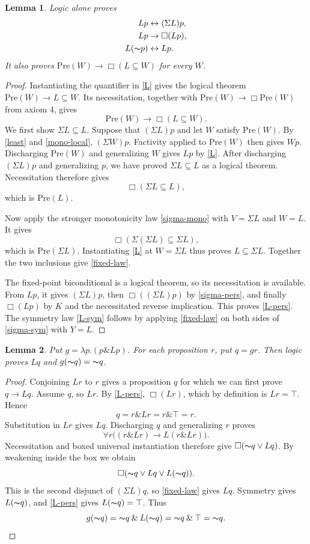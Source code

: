 \documentclass[12pt,leqno]{article}
\newcommand{\AND}{\ensuremath{\mathbin{\&}}}
\newcommand{\OR}{\ensuremath{\vee}}
\newcommand{\IFF}{\ensuremath{\leftrightarrow}}
\newcommand{\IC}{\ensuremath{\rightarrow}}
\newcommand{\NOT}{\ensuremath{\text{$\thicksim$}}}
\newcommand{\Pre}{\mathrm{Pre}}
\newtheorem{lemma}{Lemma}
\begin{document}
\begin{lemma}\label{fixed}
Logic alone proves
\begin{align}
 Lp&\IFF(\Sigma L)p,\label{fixed-law}\\
 Lp&\IC\Box(Lp),\label{L-pers}\\
 L(\NOT p)&\IFF Lp.\label{L-sym}
\end{align}
It also proves $\Pre(W)\IC\Box(L\subseteq W)$ for every $W$.
\end{lemma}
\begin{proof}
Instantiating the quantifier in \eqref{L} gives the logical theorem
$\Pre(W)\IC L\subseteq W$. Its necessitation, together with
$\Pre(W)\IC\Box\Pre(W)$ from axiom $4$, gives
\begin{equation}
 \Pre(W)\IC\Box(L\subseteq W).
 \label{least}
\end{equation}
We first show $\Sigma L\subseteq L$. Suppose that $(\Sigma L)p$ and
let $W$ satisfy $\Pre(W)$. By \eqref{least} and
\eqref{mono-local}, $(\Sigma W)p$. Factivity applied to
$\Pre(W)$ then gives $Wp$. Discharging $\Pre(W)$ and generalizing
$W$ gives $Lp$ by \eqref{L}. After discharging $(\Sigma L)p$ and generalizing $p$,
we have proved $\Sigma L\subseteq L$ as a logical theorem.
Necessitation therefore gives
\[
 \Box(\Sigma L\subseteq L),
\]
which is $\Pre(L)$.

Now apply the stronger monotonicity law \eqref{sigma-mono} with
$V=\Sigma L$ and $W=L$. It gives
\[
 \Box(\Sigma(\Sigma L)\subseteq\Sigma L),
\]
which is $\Pre(\Sigma L)$. Instantiating \eqref{L} at
$W=\Sigma L$ thus proves $L\subseteq\Sigma L$.
Together the two inclusions give \eqref{fixed-law}.

The fixed-point biconditional is a logical theorem, so its necessitation
is available. From $Lp$, it gives $(\Sigma L)p$, then
$\Box((\Sigma L)p)$ by \eqref{sigma-pers}, and finally $\Box(Lp)$
by $K$ and the necessitated reverse implication. This proves
\eqref{L-pers}. The symmetry law \eqref{L-sym} follows by applying
\eqref{fixed-law} on both sides of \eqref{sigma-sym} with $Y=L$.
\end{proof}

\begin{lemma}\label{diagonal}
Put $g=\lambda p.(p\AND Lp)$. For each proposition $r$, put $q=gr$.
Then logic proves $Lq$ and $g(\NOT q)=\NOT q$.
\end{lemma}
\begin{proof}
Conjoining $Lr$ to $r$ gives a proposition $q$ for which we can first
prove $q\IC Lq$. Assume $q$, so $Lr$. By \eqref{L-pers},
$\Box(Lr)$, which by definition is $Lr=\top$. Hence
\[
 q=r\AND Lr=r\AND\top=r.
\]
Substitution in $Lr$ gives $Lq$.
Discharging $q$ and generalizing $r$ proves
\[
 \forall r\bigl((r\AND Lr)\IC L(r\AND Lr)\bigr).
\]
Necessitation and boxed universal instantiation therefore give
$\Box(\NOT q\OR Lq)$. By weakening inside the box we obtain
\[
 \Box(\NOT q\OR Lq\OR L(\NOT q)).
\]
This is the second disjunct of $(\Sigma L)q$, so
\eqref{fixed-law} gives $Lq$. Symmetry gives $L(\NOT q)$, and
\eqref{L-pers} gives $L(\NOT q)=\top$. Thus
\[
 g(\NOT q)=\NOT q\AND L(\NOT q)
          =\NOT q\AND\top=\NOT q.\qedhere
\]
\end{proof}
\end{document}
